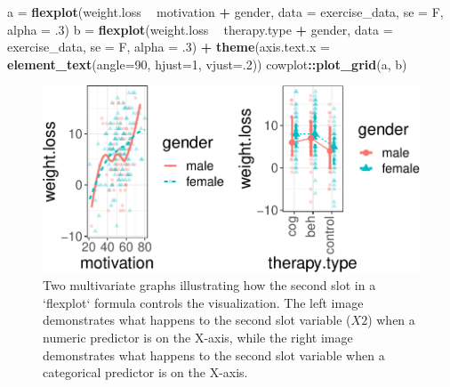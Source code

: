 \documentclass[
  man]{apa6}
\newenvironment{Shaded}{\begin{snugshade}}{\end{snugshade}}
\newcommand{\DataTypeTok}[1]{\textcolor[rgb]{0.13,0.29,0.53}{#1}}
\newcommand{\DecValTok}[1]{\textcolor[rgb]{0.00,0.00,0.81}{#1}}
\newcommand{\FloatTok}[1]{\textcolor[rgb]{0.00,0.00,0.81}{#1}}
\newcommand{\KeywordTok}[1]{\textcolor[rgb]{0.13,0.29,0.53}{\textbf{#1}}}
\newcommand{\NormalTok}[1]{#1}
\newcommand{\OperatorTok}[1]{\textcolor[rgb]{0.81,0.36,0.00}{\textbf{#1}}}
\newcommand{\StringTok}[1]{\textcolor[rgb]{0.31,0.60,0.02}{#1}}
\begin{document}
\begin{Shaded}
\begin{Highlighting}[]
\NormalTok{a =}\StringTok{ }\KeywordTok{flexplot}\NormalTok{(weight.loss }\OperatorTok{~}\StringTok{ }\NormalTok{motivation }\OperatorTok{+}\StringTok{ }\NormalTok{gender, }
    \DataTypeTok{data =}\NormalTok{ exercise_data, }\DataTypeTok{se =}\NormalTok{ F, }\DataTypeTok{alpha =} \FloatTok{.3}\NormalTok{)}
\NormalTok{b =}\StringTok{ }\KeywordTok{flexplot}\NormalTok{(weight.loss }\OperatorTok{~}\StringTok{ }\NormalTok{therapy.type }\OperatorTok{+}\StringTok{ }\NormalTok{gender, }
    \DataTypeTok{data =}\NormalTok{ exercise_data, }\DataTypeTok{se =}\NormalTok{ F, }\DataTypeTok{alpha =} \FloatTok{.3}\NormalTok{) }\OperatorTok{+}
\StringTok{    }\KeywordTok{theme}\NormalTok{(}\DataTypeTok{axis.text.x =} \KeywordTok{element_text}\NormalTok{(}\DataTypeTok{angle=}\DecValTok{90}\NormalTok{, }\DataTypeTok{hjust=}\DecValTok{1}\NormalTok{, }\DataTypeTok{vjust=}\NormalTok{.}\DecValTok{2}\NormalTok{))}
\NormalTok{cowplot}\OperatorTok{::}\KeywordTok{plot_grid}\NormalTok{(a, b)}
\end{Highlighting}
\end{Shaded}

\begin{figure}

{\centering \includegraphics[width=1\linewidth]{flexplot_psychmeth_files/figure-latex/symbols-1} 

}

\caption{Two multivariate graphs illustrating how the second slot in a `flexplot` formula controls the visualization. The left image demonstrates what happens to the second slot variable ($X2$) when a numeric predictor is on the X-axis, while the right image demonstrates what happens to the second slot variable when a categorical predictor is on the X-axis.\label{fig:symbols}}\label{fig:symbols}
\end{figure}
\end{document}

